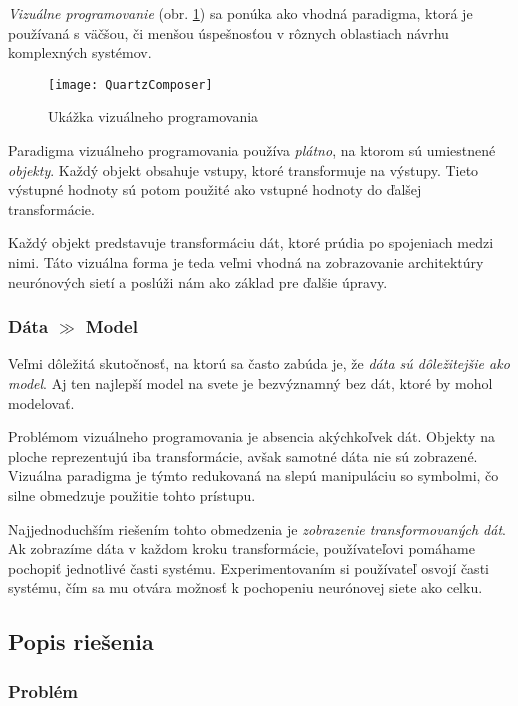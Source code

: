\emph{Vizuálne programovanie} (obr. \ref{fig:QuartzComposer}) sa ponúka ako vhodná paradigma, ktorá je používaná s väčšou, či menšou úspešnosťou v rôznych oblastiach návrhu komplexných systémov.

\begin{figure}[b]
  \centering
  \texttt{[image: QuartzComposer]}
  \caption{Ukážka vizuálneho programovania}
  \label{fig:QuartzComposer}
\end{figure}

Paradigma vizuálneho programovania používa \emph{plátno}, na ktorom sú umiestnené \emph{objekty}. Každý objekt obsahuje vstupy, ktoré transformuje na výstupy. Tieto výstupné hodnoty sú potom použité ako vstupné hodnoty do ďalšej transformácie.

Každý objekt predstavuje transformáciu dát, ktoré prúdia po spojeniach medzi nimi. Táto vizuálna forma je teda veľmi vhodná na zobrazovanie architektúry neurónových sietí a poslúži nám ako základ pre ďalšie úpravy.

\subsubsection{Dáta $\gg$ Model}

Veľmi dôležitá skutočnosť, na ktorú sa často zabúda je, že \emph{dáta sú dôležitejšie ako model}. Aj ten najlepší model na svete je bezvýznamný bez dát, ktoré by mohol modelovať.

Problémom vizuálneho programovania je absencia akýchkoľvek dát. Objekty na ploche reprezentujú iba transformácie, avšak samotné dáta nie sú zobrazené. Vizuálna paradigma je týmto redukovaná na slepú manipuláciu so symbolmi, čo silne obmedzuje použitie tohto prístupu.

Najjednoduchším riešením tohto obmedzenia je \emph{zobrazenie transformovaných dát}. Ak zobrazíme dáta v každom kroku transformácie, používateľovi pomáhame pochopiť jednotlivé časti systému. Experimentovaním si používateľ osvojí časti systému, čím sa mu otvára možnosť k pochopeniu neurónovej siete ako celku.\autocite{Victor2013}

\subsection{Popis riešenia}

\subsubsection{Problém}

